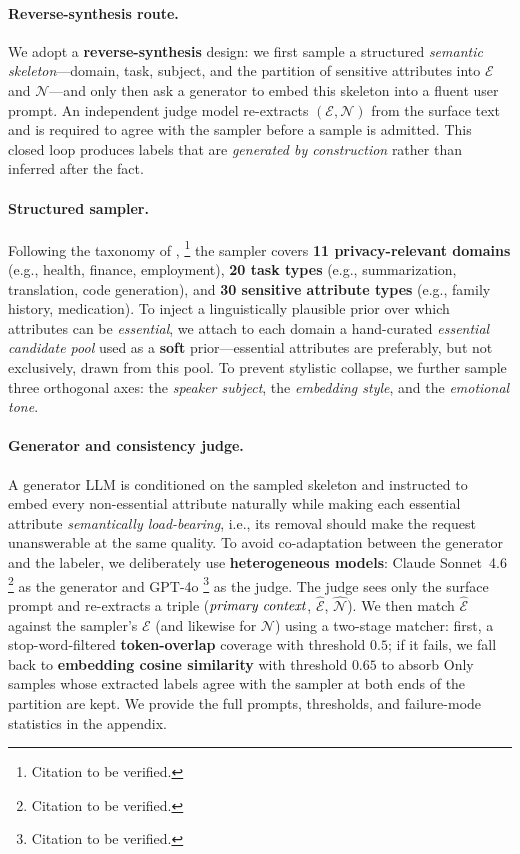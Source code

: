 \paragraph{Reverse-synthesis route.}
We adopt a \textbf{reverse-synthesis} design: we first sample
a structured \emph{semantic skeleton}---domain, task, subject, and
the partition of sensitive attributes into $\mathcal{E}$ and
$\mathcal{N}$---and only then ask a generator to embed this skeleton
into a fluent user prompt. An independent judge model re-extracts
$(\mathcal{E},\mathcal{N})$ from the surface text and is required to
agree with the sampler before a sample is admitted. This closed loop
produces labels that are \emph{generated by construction} rather than
inferred after the fact.

\paragraph{Structured sampler.}
Following the taxonomy of \citet{ngong2025contextual},%
\footnote{Citation to be verified.}
the sampler covers \textbf{11 privacy-relevant domains} (e.g., health,
finance, employment), \textbf{20 task types} (e.g., summarization,
translation, code generation), and \textbf{30 sensitive attribute
types} (e.g., family history, medication). To inject a linguistically
plausible prior over which attributes can be \emph{essential}, we
attach to each domain a hand-curated \emph{essential candidate pool}
used as a \textbf{soft} prior---essential attributes are preferably,
but not exclusively, drawn from this pool. To prevent stylistic
collapse, we further sample three orthogonal axes: the
\emph{speaker subject}, the \emph{embedding style}, and the
\emph{emotional tone}.

\paragraph{Generator and consistency judge.}
A generator LLM is conditioned on the sampled skeleton and instructed
to embed every non-essential attribute naturally while making each
essential attribute \emph{semantically load-bearing}, i.e., its
removal should make the request unanswerable at the same quality. To
avoid co-adaptation between the generator and the labeler, we
deliberately use \textbf{heterogeneous models}: Claude Sonnet~4.6%
\footnote{Citation to be verified.}
as the generator and GPT-4o%
\footnote{Citation to be verified.}
as the judge. The judge sees only the surface prompt and re-extracts
a triple ($\emph{primary context}$, $\hat{\mathcal{E}}$,
$\hat{\mathcal{N}}$). We then match $\hat{\mathcal{E}}$ against the
sampler's $\mathcal{E}$ (and likewise for $\mathcal{N}$) using a
two-stage matcher: first, a stop-word-filtered \textbf{token-overlap}
coverage with threshold $0.5$; if it fails, we fall back to
\textbf{embedding cosine similarity} with threshold $0.65$ to absorb
Only samples whose extracted labels agree with
the sampler at both ends of the partition are kept. We provide the
full prompts, thresholds, and failure-mode statistics in the
appendix.

